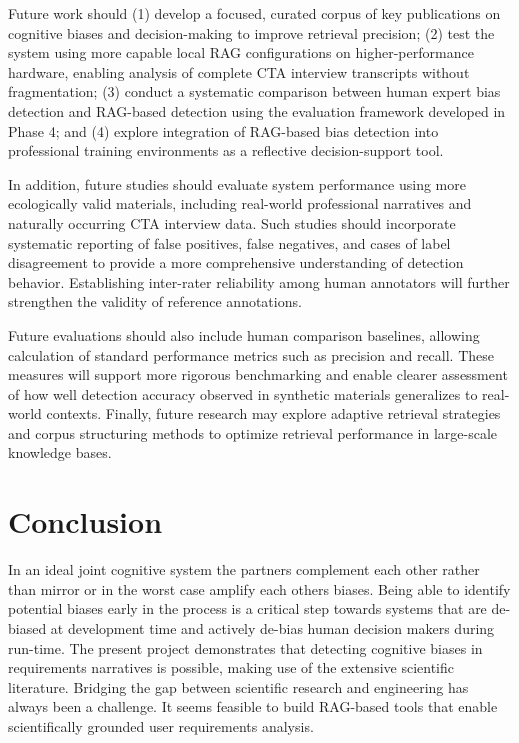 \documentclass[
  letterpaper,
  DIV=11,
  numbers=noendperiod]{scrartcl}
\begin{document}
Future work should (1) develop a focused, curated corpus of key
publications on cognitive biases and decision-making to improve
retrieval precision; (2) test the system using more capable local RAG
configurations on higher-performance hardware, enabling analysis of
complete CTA interview transcripts without fragmentation; (3) conduct a
systematic comparison between human expert bias detection and RAG-based
detection using the evaluation framework developed in Phase 4; and (4)
explore integration of RAG-based bias detection into professional
training environments as a reflective decision-support tool.

In addition, future studies should evaluate system performance using
more ecologically valid materials, including real-world professional
narratives and naturally occurring CTA interview data. Such studies
should incorporate systematic reporting of false positives, false
negatives, and cases of label disagreement to provide a more
comprehensive understanding of detection behavior. Establishing
inter-rater reliability among human annotators will further strengthen
the validity of reference annotations.

Future evaluations should also include human comparison baselines,
allowing calculation of standard performance metrics such as precision
and recall. These measures will support more rigorous benchmarking and
enable clearer assessment of how well detection accuracy observed in
synthetic materials generalizes to real-world contexts. Finally, future
research may explore adaptive retrieval strategies and corpus
structuring methods to optimize retrieval performance in large-scale
knowledge bases.

\section{Conclusion}\label{conclusion}

In an ideal joint cognitive system the partners complement each other
rather than mirror or in the worst case amplify each others biases.
Being able to identify potential biases early in the process is a
critical step towards systems that are de-biased at development time and
actively de-bias human decision makers during run-time. The present
project demonstrates that detecting cognitive biases in requirements
narratives is possible, making use of the extensive scientific
literature. Bridging the gap between scientific research and engineering
has always been a challenge. It seems feasible to build RAG-based tools
that enable scientifically grounded user requirements analysis.
\end{document}
